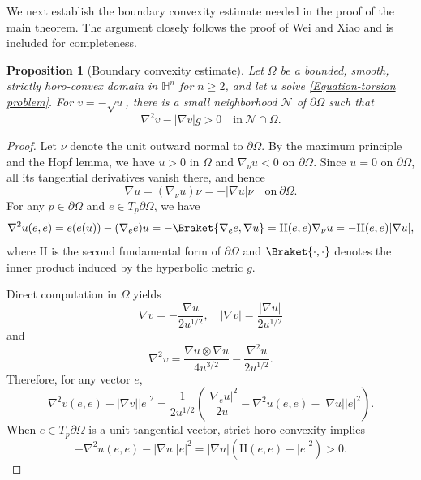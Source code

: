 \documentclass[11pt]{amsart}
\newtheorem{proposition}[theorem]{Proposition}
\numberwithin{theorem}{section}
\numberwithin{equation}{section}
\begin{document}
We next establish the boundary convexity estimate needed in the proof of the main theorem. The argument closely follows the proof of Wei and Xiao \cite[Lemma 4.1]{Wei-Xiao2025} and is included for completeness.
\begin{proposition}[Boundary convexity estimate]\label{Proposition-boundary estimate}
Let $\Omega$ be a bounded, smooth, strictly horo-convex domain in $\mathbb{H}^n$ for $n\geq 2$, and let $u$ solve \eqref{Equation-torsion problem}. For $v=-\sqrt{u}$, there is a small neighborhood $\mathcal{N}$ of $\partial\Omega$ such that $$\nabla^2v-|\nabla v|g>0\quad \mathrm{in}\ \mathcal{N}\cap\Omega.$$
\end{proposition}
\begin{proof}
Let $\nu$ denote the unit outward normal to $\partial\Omega$. By the maximum principle and the Hopf lemma, we have $u>0$ in $\Omega$ and $\nabla_\nu u<0$ on $\partial\Omega$. Since $u=0$ on $\partial\Omega$, all its tangential derivatives vanish there, and hence $$\nabla u=(\nabla_\nu u)\nu=-|\nabla u|\nu\quad\mathrm{on}\ \partial\Omega.$$ For any $p\in\partial\Omega$ and $e\in T_p\partial\Omega$, we have $$\nabla^2u(e,e)=e(e(u))-(\nabla_ee)u=-\Braket{\nabla_ee,\nabla u}=\mathrm{II}(e,e)\nabla_\nu u=-\mathrm{II}(e,e)|\nabla u|,$$ where $\mathrm{II}$ is the second fundamental form of $\partial\Omega$ and $\Braket{\cdot,\cdot}$ denotes the inner product induced by the hyperbolic metric $g$.

Direct computation in $\Omega$ yields $$\nabla v=-\frac{\nabla u}{2u^{1/2}},\quad |\nabla v|=\frac{|\nabla u|}{2u^{1/2}}$$ and $$\nabla^2v=\frac{\nabla u\otimes\nabla u}{4u^{3/2}}-\frac{\nabla^2u}{2u^{1/2}}.$$ Therefore, for any vector $e$,
\begin{equation}\label{Boundary convexity estimate-general}
\nabla^2v(e,e)-|\nabla v||e|^2=\frac{1}{2u^{1/2}}\left(\frac{|\nabla_eu|^2}{2u}-\nabla^2u(e,e)-|\nabla u||e|^2\right).
\end{equation}
When $e\in T_p\partial\Omega$ is a unit tangential vector, strict horo-convexity implies
\begin{equation}\label{Boundary convexity estimate-tangential}
-\nabla^2u(e,e)-|\nabla u||e|^2=|\nabla u|(\mathrm{II}(e,e)-|e|^2)>0.
\end{equation}


\end{proof}
\end{document}
